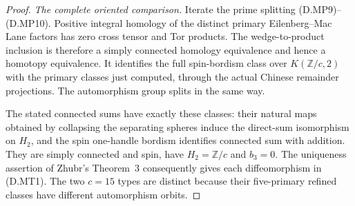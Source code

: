 \begin{proof}
\emph{The complete oriented comparison.}
Iterate the prime splitting (D.MP9)--(D.MP10).
Positive integral homology of the distinct primary
Eilenberg--Mac Lane factors has zero cross tensor and
Tor products. The wedge-to-product inclusion is therefore
a simply connected homology equivalence and hence a
homotopy equivalence. It identifies the full spin-bordism
class over $K(\mathbb Z/c,2)$ with the primary classes
just computed, through the actual Chinese remainder
projections. The automorphism group splits in the same way.

The stated connected sums have exactly these classes:
their natural maps obtained by collapsing the separating
spheres induce the direct-sum isomorphism on $H_2$, and
the spin one-handle bordism identifies connected sum
with addition. They are simply connected and spin, have
$H_2=\mathbb Z/c$ and $b_3=0$. The uniqueness assertion
of Zhubr's Theorem~3 \cite[p.795]{manZhubr75} consequently
gives each diffeomorphism in (D.MT1). The two $c=15$
types are distinct because their five-primary refined
classes have different automorphism orbits.
\end{proof}
